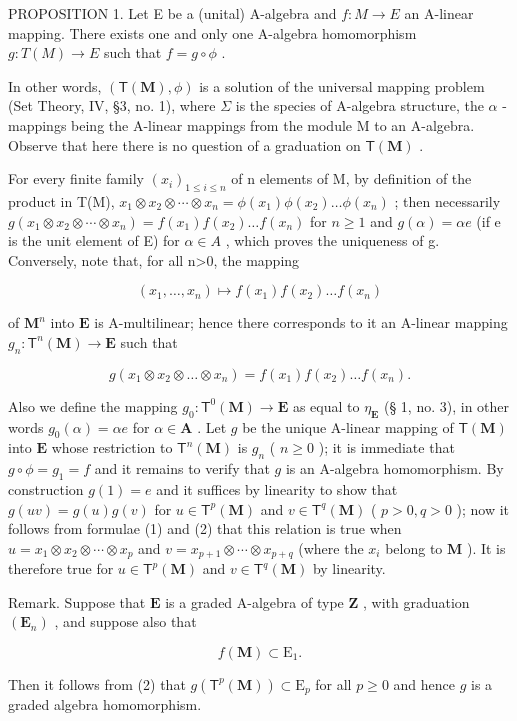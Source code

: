 PROPOSITION 1. Let E be a (unital) A-algebra and \(f:M\to E\) an A-linear mapping. There exists one and only one A-algebra homomorphism \(g:T(M)\to E\) such that \(f=g\circ\phi\) .

In other words, \((\mathsf{T}(\mathbf{M}), \phi)\) is a solution of the universal mapping problem (Set Theory, IV, §3, no. 1), where \(\Sigma\) is the species of A-algebra structure, the \(\alpha\) -mappings being the A-linear mappings from the module M to an A-algebra. Observe that here there is no question of a graduation on \(\mathsf{T}(\mathbf{M})\) .

For every finite family \((x_{i})_{1\leqslant i\leqslant n}\) of n elements of M, by definition of the product in T(M), \(x_{1}\otimes x_{2}\otimes\cdots\otimes x_{n}=\phi(x_{1})\phi(x_{2})\ldots\phi(x_{n})\) ; then necessarily \(g(x_{1}\otimes x_{2}\otimes\cdots\otimes x_{n})=f(x_{1})f(x_{2})\ldots f(x_{n})\) for \(n\geqslant1\) and \(g(\alpha)=\alpha e\) (if e is the unit element of E) for \(\alpha\in A\) , which proves the uniqueness of g. Conversely, note that, for all n\textgreater0, the mapping

\[
(x _ {1}, \dots , x _ {n}) \mapsto f (x _ {1}) f (x _ {2}) \dots f (x _ {n})
\]

of \(\mathbf{M}^n\) into \(\mathbf{E}\) is A-multilinear; hence there corresponds to it an A-linear mapping \(g_n: \mathsf{T}^n(\mathbf{M}) \to \mathbf{E}\) such that

\[
g \left(x _ {1} \otimes x _ {2} \otimes \dots \otimes x _ {n}\right) = f \left(x _ {1}\right) f \left(x _ {2}\right) \dots f \left(x _ {n}\right).\tag{2}
\]

Also we define the mapping \(g_0 \colon \mathsf{T}^0(\mathbf{M}) \to \mathbf{E}\) as equal to \(\eta_{\mathbf{E}}\) (§ 1, no. 3), in other words \(g_0(\alpha) = \alpha e\) for \(\alpha \in \mathbf{A}\) . Let \(g\) be the unique A-linear mapping of \(\mathsf{T}(\mathbf{M})\) into \(\mathbf{E}\) whose restriction to \(\mathsf{T}^n(\mathbf{M})\) is \(g_n\) ( \(n \geqslant 0\) ); it is immediate that \(g \circ \phi = g_1 = f\) and it remains to verify that \(g\) is an A-algebra homomorphism. By construction \(g(1) = e\) and it suffices by linearity to show that \(g(uv) = g(u)g(v)\) for \(u \in \mathsf{T}^p(\mathbf{M})\) and \(v \in \mathsf{T}^q(\mathbf{M})\) ( \(p > 0, q > 0\) ); now it follows from formulae (1) and (2) that this relation is true when \(u = x_1 \otimes x_2 \otimes \cdots \otimes x_p\) and \(v = x_{p+1} \otimes \cdots \otimes x_{p+q}\) (where the \(x_i\) belong to \(\mathbf{M}\) ). It is therefore true for \(u \in \mathsf{T}^p(\mathbf{M})\) and \(v \in \mathsf{T}^q(\mathbf{M})\) by linearity.

Remark. Suppose that \(\mathbf{E}\) is a graded A-algebra of type \(\mathbf{Z}\) , with graduation \((\mathbf{E}_n)\) , and suppose also that

\[
f (\mathbf {M}) \subset \mathrm{E} _ {1}.\tag{3}
\]

Then it follows from (2) that \(g(\mathsf{T}^p (\mathbf{M})) \subset \mathrm{E}_p\) for all \(p \geqslant 0\) and hence \(g\) is a graded algebra homomorphism.

